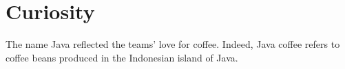 \documentclass{article}
\theoremstyle{definition}
\begin{document}
\section{Curiosity}
\begin{framed}
The name Java reflected the teams’ love for coffee. Indeed, Java coffee refers to coffee beans produced in the Indonesian island of Java.
\end{framed}

\clearpage







\nocite{*}
\end{document}
